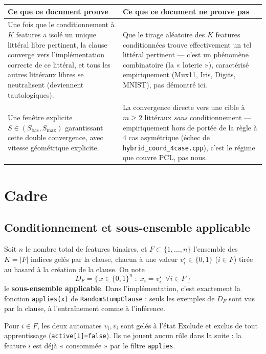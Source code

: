 \documentclass[12pt,a4paper]{article}
\theoremstyle{remark}
\newcommand{\Exc}{\ensuremath{\mathrm{Exclude}}}
\newcommand{\vbar}{\bar{v}}
\newcommand{\DF}{D_F}
\begin{document}
\begin{center}
\renewcommand{\arraystretch}{1.3}
\begin{tabular}{p{6.3cm}p{6.3cm}}
\toprule
\textbf{Ce que ce document prouve} & \textbf{Ce que ce document ne prouve pas} \\
\midrule
Une fois que le conditionnement à $K$ features a isolé un unique littéral libre
pertinent, la clause converge vers l'implémentation correcte de ce littéral, et
tous les autres littéraux libres se neutralisent (deviennent tautologiques).
&
Que le tirage aléatoire des $K$ features conditionnées trouve effectivement un tel
littéral pertinent --- c'est un phénomène combinatoire (la « loterie »),
caractérisé empiriquement (Mux11, Iris, Digits, MNIST), pas démontré ici.
\\
\addlinespace
Une fenêtre explicite $S\in(S_{\text{bas}}, S_{\max})$ garantissant cette double
convergence, avec vitesse géométrique explicite.
&
La convergence directe vers une cible à $m\ge2$ littéraux \emph{sans}
conditionnement --- empiriquement hors de portée de la règle à 4 cas asymétrique
(échec de \texttt{hybrid\_coord\_4case.cpp}), c'est le régime que couvre PCL, pas nous.
\\
\bottomrule
\end{tabular}
\end{center}

\section{Cadre}

\subsection{Conditionnement et sous-ensemble applicable}

Soit $n$ le nombre total de features binaires, et $F\subset\{1,\ldots,n\}$ l'ensemble
des $K=|F|$ indices gelés par la clause, chacun à une valeur $v_i^\star\in\{0,1\}$
($i\in F$) tirée au hasard à la création de la clause. On note
\[
  \DF = \bigl\{\, x\in\{0,1\}^n \;:\; x_i = v_i^\star \ \ \forall i\in F \,\bigr\}
\]
le \textbf{sous-ensemble applicable}. Dans l'implémentation, c'est exactement la
fonction \texttt{applies(x)} de \texttt{RandomStumpClause} : seuls les exemples de
$\DF$ sont vus par la clause, à l'entraînement comme à l'inférence.

Pour $i\in F$, les deux automates $v_i,\vbar_i$ sont gelés à l'état \Exc{} et exclus
de tout apprentissage (\texttt{active[i]=false}). Ils ne jouent aucun rôle dans la
suite : la feature $i$ est déjà « consommée » par le filtre \texttt{applies}.
\end{document}
